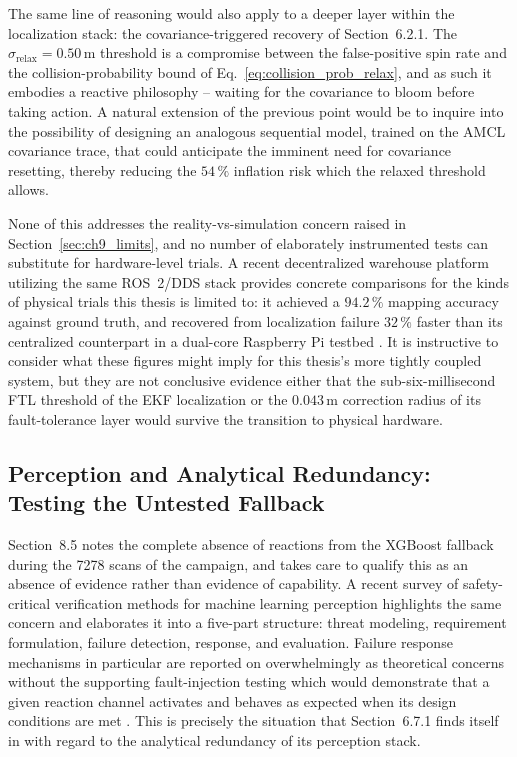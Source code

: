 The same line of reasoning would also apply to a deeper layer within the localization stack: the covariance-triggered recovery of Section~6.2.1. The $\sigma_{\text{relax}} = 0.50\,\text{m}$ threshold is a compromise between the false-positive spin rate and the collision-probability bound of Eq.~\eqref{eq:collision_prob_relax}, and as such it embodies a reactive philosophy -- waiting for the covariance to bloom before taking action. A natural extension of the previous point would be to inquire into the possibility of designing an analogous sequential model, trained on the AMCL covariance trace, that could anticipate the imminent need for covariance resetting, thereby reducing the $54\,\%$ inflation risk which the relaxed threshold allows.

None of this addresses the reality-vs-simulation concern raised in Section~\ref{sec:ch9_limits}, and no number of elaborately instrumented tests can substitute for hardware-level trials. A recent decentralized warehouse platform utilizing the same ROS~2/DDS stack provides concrete comparisons for the kinds of physical trials this thesis is limited to: it achieved a $94.2\,\%$ mapping accuracy against ground truth, and recovered from localization failure $32\,\%$ faster than its centralized counterpart in a dual-core Raspberry Pi testbed \cite{gaadhe2026collective}. It is instructive to consider what these figures might imply for this thesis's more tightly coupled system, but they are not conclusive evidence either that the sub-six-millisecond FTL threshold of the EKF localization or the $0.043\,\text{m}$ correction radius of its fault-tolerance layer would survive the transition to physical hardware.

\subsection{Perception and Analytical Redundancy: Testing the Untested Fallback}

Section~8.5 notes the complete absence of reactions from the XGBoost fallback during the 7278 scans of the campaign, and takes care to qualify this as an absence of evidence rather than evidence of capability. A recent survey of safety-critical verification methods for machine learning perception highlights the same concern and elaborates it into a five-part structure: threat modeling, requirement formulation, failure detection, response, and evaluation. Failure response mechanisms in particular are reported on overwhelmingly as theoretical concerns without the supporting fault-injection testing which would demonstrate that a given reaction channel activates and behaves as expected when its design conditions are met \cite{ferreira2025safety}. This is precisely the situation that Section~6.7.1 finds itself in with regard to the analytical redundancy of its perception stack.

